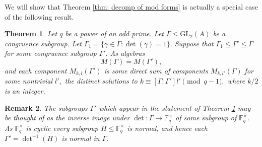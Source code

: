 \documentclass[11pt]{amsart}
\newtheorem{theorem}{Theorem}[section]
\newtheorem{remark}[theorem]{Remark}
\theoremstyle{definition}
\numberwithin{equation}{section}
\newcommand{\GL}{\mathrm{GL}} 	%
\newcommand{\bbF}{\mathbb{F}}		%
\begin{document}
We will show that Theorem \ref{thm: decomp of mod forms} is actually a special case of the following result.
\begin{theorem}
	\label{thm: generalized decomp}
	Let $q$ be a power of an odd prime. Let $\Gamma\leq \GL_2(A)$ be a congruence subgroup. Let $\Gamma_1=\{\gamma\in \Gamma: \det(\gamma)=1\}.$ Suppose that $\Gamma_1\leq \Gamma'\leq \Gamma$ for some congruence subgroup $\Gamma'.$ As algebras
	\[M(\Gamma)=M(\Gamma'),\] and each component $M_{k,l}(\Gamma')$ is some direct sum of components $M_{k,l'}(\Gamma)$ for some nontrivial $l',$ the distinct solutions to $k\equiv [\Gamma:\Gamma']l'\pmod{q-1},$ where $k/2$ is an integer.
\end{theorem}
\begin{remark}
	The subgroups $\Gamma'$ which appear in the statement of Theorem \ref{thm: generalized decomp} may be thought of as the inverse image under $\det:\Gamma\to \bbF_q^{\times}$ of some subgroup of $\bbF_q^{\times}.$ As $\bbF_q^{\times}$ is cyclic every subgroup $H\leq \bbF_q^{\times}$ is normal, and hence each $\Gamma'=\det^{-1}(H)$ is normal in $\Gamma.$
\end{remark}
\end{document}
